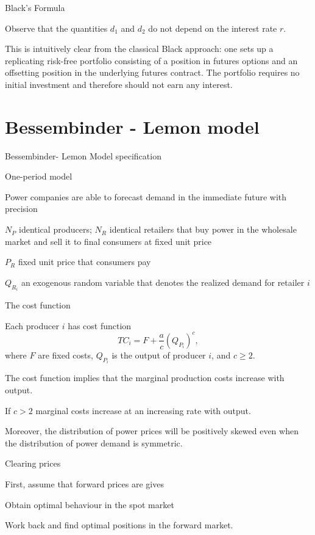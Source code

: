 {Black's Formula}
\item<1->
Observe that the quantities $d_1$ and $d_2$ do not depend on the
interest rate $r$.
\item<2-> This is intuitively clear from the classical
Black approach: one sets up a replicating risk-free portfolio
consisting of a position in futures options and an offsetting
position in the underlying futures contract. The portfolio
requires no initial investment and therefore should not earn any
interest.

\section{Bessembinder - Lemon model}

{Bessembinder- Lemon Model specification}
\item<1-> One-period model
\item<2-> Power companies are able to forecast demand in the immediate future with precision
\item<3-> $N_P$ identical producers; $N_R$ identical retailers that buy power in the wholesale market and sell it to final consumers at fixed unit price
\item<4-> $P_R$ fixed unit price that consumers pay
\item<5-> $Q_{R_i}$ an exogenous random variable that denotes the realized demand for retailer $i$

{The cost function}
\item<1-> Each producer $i$ has cost function
$$
TC_i=F+\frac{a}{c}(Q_{P_i})^c,
$$
where $F$ are fixed costs, $Q_{P_i}$ is the output of producer $i$, and $c\geq 2$.
\item<2-> The cost function implies that the marginal production costs increase with output.
\item<3-> If $c>2$ marginal costs increase at an increasing rate with output.
\item<4-> Moreover, the distribution of power prices will be positively skewed even when the distribution of power demand is symmetric.

{Clearing prices}
\item<1-> First, assume that forward prices are gives
\item<2-> Obtain optimal behaviour in the spot market
\item<3-> Work back and find optimal positions in the forward market.

